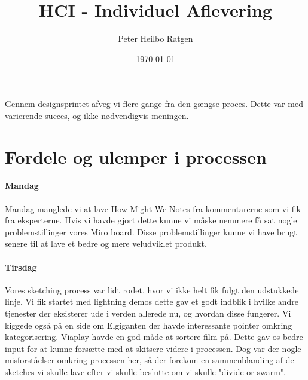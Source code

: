 \documentclass{article}
\title{HCI - Individuel Aflevering}
\author{Peter Heilbo Ratgen}
\date{\today}
\begin{document}
\maketitle
Gennem designsprintet afveg vi flere gange fra den gængse proces. Dette var med
varierende succes, og ikke nødvendigvis meningen.

\section{Fordele og ulemper i processen}


\paragraph{Mandag}

Mandag manglede vi at lave How Might We Notes fra kommentarerne som vi fik fra
eksperterne. Hvis vi havde gjort dette kunne vi måske nemmere få sat nogle
problemstillinger vores Miro board. Disse problemstillinger kunne vi have brugt
senere til at lave et bedre og mere veludviklet produkt.

\paragraph{Tirsdag}


Vores sketching process var lidt rodet, hvor vi ikke helt fik fulgt den
udstukkede linje. Vi fik startet med lightning demos dette gav et godt indblik i
hvilke andre tjenester der eksisterer ude i verden allerede nu, og hvordan disse
fungerer. Vi kiggede også på en side om Elgiganten der havde interessante
pointer omkring kategorisering.  Viaplay havde en god måde at sortere film på.
Dette gav os bedre input for at kunne forsætte med at skitsere videre i
processen. Dog var der nogle misforståelser omkring processen her, så der
forekom en sammenblanding af de sketches vi skulle lave efter vi skulle beslutte
om vi skulle "divide or swarm".
\end{document}
